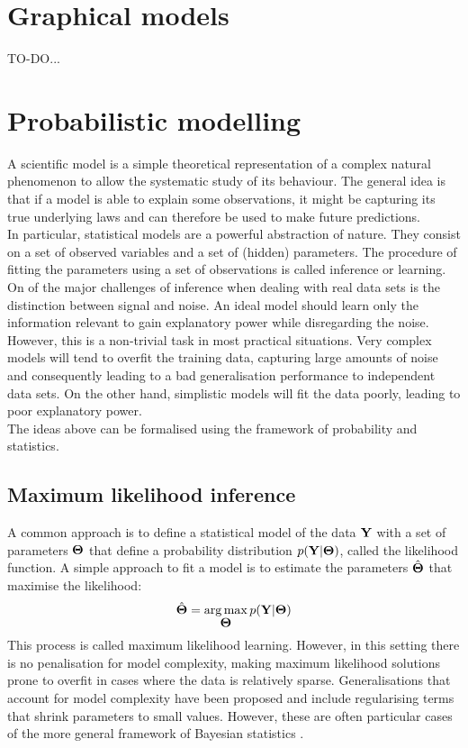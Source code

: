 \section{Graphical models}
TO-DO...

\section{Probabilistic modelling}
A scientific model is a simple theoretical representation of a complex natural phenomenon to allow the systematic study of its behaviour. The general idea is that if a model is able to explain some observations, it might be capturing its true underlying laws and can therefore be used to make future predictions.\\ 
In particular, statistical models are a powerful abstraction of nature. They consist on a set of observed variables and a set of (hidden) parameters. The procedure of fitting the parameters using a set of observations is called inference or learning.\\
On of the major challenges of inference when dealing with real data sets is the distinction between signal and noise. An ideal model should learn only the information relevant to gain explanatory power while disregarding the noise. However, this is a non-trivial task in most practical situations. Very complex models will tend to overfit the training data, capturing large amounts of noise and consequently leading to a bad generalisation performance to independent data sets. On the other hand, simplistic models will fit the data poorly, leading to poor explanatory power.\\

The ideas above can be formalised using the framework of probability and statistics.

\subsection{Maximum likelihood inference}
A common approach is to define a statistical model of the data ${\bf Y}$ with a set of parameters $\mbox{\boldmath $\Theta$}$ that define a probability distribution $p({\bf Y}|\mbox{\boldmath $\Theta$})$, called the likelihood function. A simple approach to fit a model is to estimate the parameters $\hat{\mbox{\boldmath $\Theta$}}$ that maximise the likelihood:
\[
	\hat{\mbox{\boldmath $\Theta$}} = \operatorname*{arg\,max}_{\mbox{\boldmath $\Theta$}} p({\bf Y}|\mbox{\boldmath $\Theta$})
\]
This process is called maximum likelihood learning\cite{Stigler2008,Bishop,Murphy}. However, in this setting there is no penalisation for model complexity, making maximum likelihood solutions prone to overfit in cases where the data is relatively sparse. Generalisations that account for model complexity have been proposed and include regularising terms that shrink parameters to small values. However, these are often particular cases of the more general framework of Bayesian statistics \cite{Hastie,Bishop,Murphy}.

